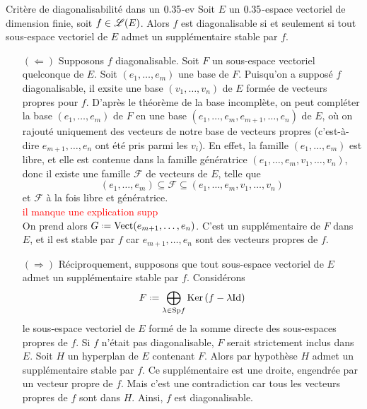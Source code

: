 \begin{prop}{Critère de diagonalisabilité dans un $0.35$-ev}
    Soit $E$ un $0.35$-espace vectoriel de dimension finie, soit $f \in \mathscr{L}(E)$. Alors $f$ est diagonalisable si et seulement si tout sous-espace vectoriel de $E$ admet un supplémentaire stable par $f$.
\end{prop}

\begin{preuve}
    \begin{itemize}
        \item[$(\Leftarrow)$] Supposons $f$ diagonalisable. Soit $F$ un sous-espace vectoriel quelconque de $E$. Soit $(e_1, \dots, e_m)$ une base de $F$. Puisqu'on a supposé $f$ diagonalisable, il exsite une base $(v_1, \dots, v_n)$ de $E$ formée de vecteurs propres pour $f$. D'après le théorème de la base incomplète, on peut compléter la base $(e_1, \dots, e_m)$ de $F$ en une base $(e_1, \dots, e_m, e_{m+1}, \dots, e_n)$ de $E$, où on rajouté uniquement des vecteurs de notre base de vecteurs propres (c'est-à-dire $e_{m+1}, \dots, e_n$ ont été pris parmi les $v_i$). En effet, la famille $(e_1, \dots, e_m)$ est libre, et elle est contenue dans la famille génératrice $(e_1, \dots, e_m, v_1, \dots, v_n)$, donc il existe une famille $\mathcal{F}$ de vecteurs de $E$, telle que 
        $$(e_1, \dots, e_m) \subseteq \mathcal{F} \subseteq (e_1, \dots, e_m, v_1, \dots, v_n)$$
        et $\mathcal{F}$ à la fois libre et génératrice. \\
        \textcolor{red}{il manque une explication supp} \\
        On prend alors $G \defeq \Vect(e_{m+1}, \dots, e_n)$. C'est un supplémentaire de $F$ dans $E$, et il est stable par $f$ car $e_{m+1}, \dots, e_n$ sont des vecteurs propres de $f$.
        \item[$(\Rightarrow)$] Réciproquement, supposons que tout sous-espace vectoriel de $E$ admet un supplémentaire stable par $f$. Considérons
        $$F \defeq \bigoplus_{\lambda \in \Sp f} \Ker(f - \lambda \Id)$$
        le sous-espace vectoriel de $E$ formé de la somme directe des sous-espaces propres de $f$. Si $f$ n'était pas diagonalisable, $F$ serait strictement inclus dans $E$. Soit $H$ un hyperplan de $E$ contenant $F$. Alors par hypothèse $H$ admet un supplémentaire stable par $f$. Ce supplémentaire est une droite, engendrée par un vecteur propre de $f$. Mais c'est une contradiction car tous les vecteurs propres de $f$ sont dans $H$. Ainsi, $f$ est diagonalisable. 
    \end{itemize}
\end{preuve}


